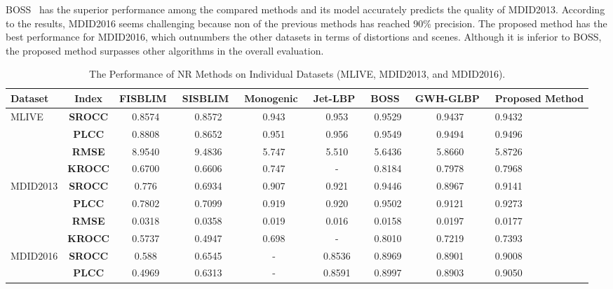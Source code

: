 BOSS~\cite{Zhou2018} has the superior performance among the compared methods and its model accurately predicts the quality of MDID2013. According to the results, MDID2016 seems challenging because non of the previous methods has reached 90\% precision. The proposed method has the best performance for MDID2016, which outnumbers the other datasets in terms of distortions and scenes. Although it is inferior to BOSS, the proposed method surpasses other algorithms in the overall evaluation.
\begin{sidewaystable}[htb]
    \caption{The Performance of NR Methods on Individual Datasets (MLIVE, MDID2013, and MDID2016).}
    \label{tbl:nr_acc}
  \bigskip
    \centering\footnotesize\setlength\tabcolsep{2pt}
        \hspace*{-1cm}\begin{tabular}{m{1.7cm}|c||c|c|c|c|c|c|m{1cm}}
             \textbf{Dataset}&\textbf{Index}&FISBLIM~\cite{Gu2013}&SISBLIM~\cite{Gu2014}&Monogenic~\cite{Zhou2019}&Jet-LBP~\cite{Hadizadeh2016}&BOSS~\cite{Zhou2018}&GWH-GLBP~\cite{Li2016}&Proposed Method\\
             \hline\hline
             \multirow{4}{4em}{MLIVE}&\textbf{SROCC}&0.8574&0.8572&0.943&0.953&0.9529&0.9437&0.9432\\[1ex]
             &\textbf{PLCC}&0.8808&0.8652&0.951&0.956&0.9549&0.9494&0.9496\\[1ex]
             &\textbf{RMSE}&8.9540&9.4836&5.747&5.510&5.6436&5.8660&5.8726\\[1ex]
             &\textbf{KROCC}&0.6700&0.6606&0.747&-&0.8184&0.7978&0.7968\\[1ex]
             \hline\hline
             \multirow{4}{4em}{MDID2013}&\textbf{SROCC}&0.776&0.6934&0.907&0.921&0.9446&0.8967&0.9141\\[1ex]
             &\textbf{PLCC}&0.7802&0.7099&0.919&0.920&0.9502&0.9121&0.9273\\[1ex]
             &\textbf{RMSE}&0.0318&0.0358&0.019&0.016&0.0158&0.0197&0.0177\\[1ex]
             &\textbf{KROCC}&0.5737&0.4947&0.698&-&0.8010&0.7219&0.7393\\[1ex]
             \hline\hline
             \multirow{4}{4em}{MDID2016}&\textbf{SROCC}&0.588&0.6545&-&0.8536&0.8969&0.8901&0.9008\\[1ex]
             &\textbf{PLCC}&0.4969&0.6313&-&0.8591&0.8997&0.8903&0.9050\\[1ex]

\end{tabular}
\end{sidewaystable}
